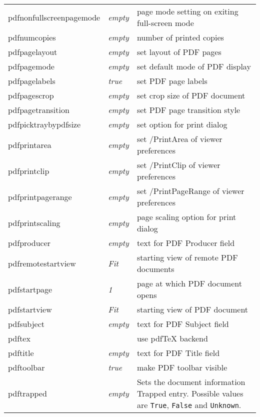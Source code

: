 \documentclass[pdftex]{article}
\begin{document}
\begin{longtable}{@{}>{\ttfamily}llp{7cm}@{}}
pdfnonfullscreenpagemode
                   & \textit{empty}         & page mode setting on exiting
                                              full-screen mode\\
pdfnumcopies       & \textit{empty}         & number of printed copies\\
pdfpagelayout      & \textit{empty}         & set layout of PDF pages \\
pdfpagemode        & \textit{empty}         & set default mode of PDF display \\
pdfpagelabels      & \textit{true}          & set PDF page labels \\
pdfpagescrop       & \textit{empty}         & set crop size of PDF document \\
pdfpagetransition  & \textit{empty}         & set PDF page transition style \\
pdfpicktraybypdfsize
                   & \textit{empty}         & set option for print dialog \\
pdfprintarea       & \textit{empty}         & set /PrintArea of viewer preferences \\
pdfprintclip       & \textit{empty}         & set /PrintClip of viewer preferences \\
pdfprintpagerange  & \textit{empty}         & set /PrintPageRange of viewer preferences \\
pdfprintscaling    & \textit{empty}         & page scaling option for print dialog \\
pdfproducer        & \textit{empty}         & text for PDF Producer field \\
pdfremotestartview & \textit{Fit}           & starting view of remote PDF documents \\
pdfstartpage       & \textit{1}             & page at which PDF document opens \\
pdfstartview       & \textit{Fit}           & starting view of PDF document \\
pdfsubject         & \textit{empty}         & text for PDF Subject field \\
pdftex             &                        & use \textsf{pdf\TeX} backend \\
pdftitle           & \textit{empty}         & text for PDF Title field \\
pdftoolbar         & \textit{true}          & make PDF toolbar visible \\
pdftrapped         & \textit{empty} & Sets the document information Trapped entry.
  Possible values are \texttt{True}, \texttt{False} and \texttt{Unknown}.

\end{longtable}
\end{document}
